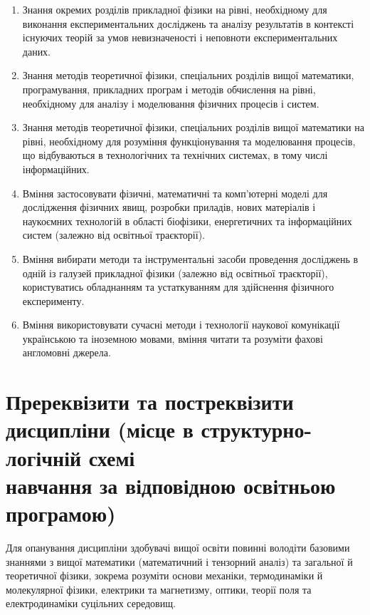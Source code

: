 \documentclass{Syllabus}
\begin{document}
\begin{enumerate}
	\item [ПРН 1:] Знання окремих розділів прикладної фізики на рівні, необхідному для виконання експериментальних досліджень та аналізу результатів в контексті існуючих теорій за умов невизначеності і неповноти експериментальних даних.
	\item [ПРН 2:] Знання методів теоретичної фізики, спеціальних розділів вищої математики, програмування, прикладних програм і методів обчислення на рівні, необхідному для аналізу і моделювання фізичних процесів і систем.
	\item [ПРН 4:] Знання методів теоретичної фізики, спеціальних розділів вищої математики на рівні, необхідному для розуміння функціонування та моделювання процесів, що відбуваються в технологічних та технічних системах, в тому числі інформаційних.
	\item [ПРН 9:] Вміння застосовувати фізичні, математичні та комп'ютерні моделі для дослідження фізичних явищ, розробки приладів, нових матеріалів і наукоємних технологій в області біофізики, енергетичних та інформаційних систем (залежно від освітньої траєкторії).
	\item [ПРН 10:] Вміння вибирати методи та інструментальні засоби проведення досліджень в одній із галузей прикладної фізики (залежно від освітньої траєкторії), користуватись обладнанням та устаткуванням для здійснення фізичного експерименту.
	\item [ПРН 13:] Вміння використовувати сучасні методи і технології наукової комунікації українською та іноземною мовами, вміння читати та розуміти фахові англомовні джерела.
\end{enumerate}


\section{Пререквізити та постреквізити дисципліни (місце в структурно-логічній схемі\\ навчання за відповідною освітньою програмою)}


Для опанування дисципліни здобувачі вищої освіти повинні володіти базовими знаннями з вищої математики (математичний і тензорний аналіз) та загальної й теоретичної фізики, зокрема розуміти основи механіки, термодинаміки й молекулярної фізики, електрики та магнетизму, оптики, теорії поля та електродинаміки суцільних середовищ.
\end{document}
